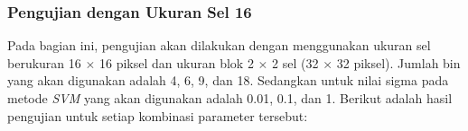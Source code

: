 \subsubsection{Pengujian dengan Ukuran Sel 16}
\noindent Pada bagian ini, pengujian akan dilakukan dengan menggunakan ukuran sel berukuran 16 $\times$ 16 piksel dan ukuran blok 2 $\times$ 2 sel (32 $\times$ 32 piksel). Jumlah bin yang akan digunakan adalah 4, 6, 9, dan 18. Sedangkan untuk nilai sigma pada metode \textit{SVM} yang akan digunakan adalah 0.01, 0.1, dan 1. Berikut adalah hasil pengujian untuk setiap kombinasi parameter tersebut:
